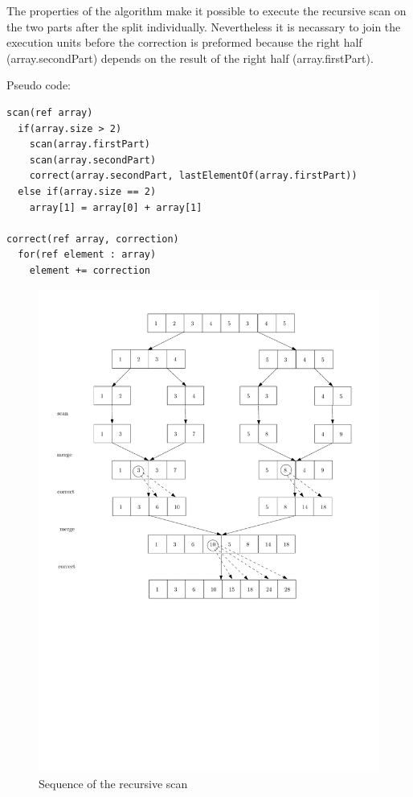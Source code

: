 \documentclass[a4paper,twoside,11pt]{article}
\begin{document}
The properties of the algorithm make it possible to execute the recursive scan on the two parts after the split individually. Nevertheless it is necassary to join the execution units before the correction is preformed because the right half (array.secondPart) depends on the result of the right half (array.firstPart). 



Pseudo code:
\begin{verbatim}
scan(ref array)
  if(array.size > 2)
    scan(array.firstPart)
    scan(array.secondPart)
    correct(array.secondPart, lastElementOf(array.firstPart))
  else if(array.size == 2)
    array[1] = array[0] + array[1]
	
correct(ref array, correction)
  for(ref element : array)
    element += correction
\end{verbatim}

\begin{figure}[hbtp]
\centering
\label{fig:para_algo}
\includegraphics[scale=.75]{recur3}
\caption{Sequence of the recursive scan}
\end{figure}
\end{document}
